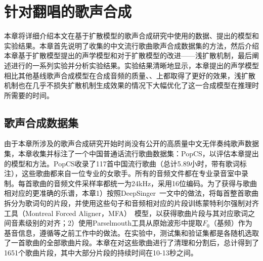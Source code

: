 \newcommand{\etal}{\textit{et al}.}
\newcommand{\ie}{\textit{i}.\textit{e}.}
\newcommand{\eg}{\textit{e}.\textit{g}.}
\newcommand{\vardbtilde}[1]{\tilde{\raisebox{0pt}[0.85\height]{$\tilde{#1}$}}}
\newcommand{\defeq}{\coloneqq}
\newcommand{\grad}{\nabla}
\newcommand{\E}{\mathbb{E}}
\newcommand{\Var}{\mathrm{Var}}
\newcommand{\Cov}{\mathrm{Cov}}
\newcommand{\Ea}[1]{\E\left[#1\right]}
\newcommand{\Eb}[2]{\E_{#1}\!\left[#2\right]}
\newcommand{\Vara}[1]{\Var\left[#1\right]}
\newcommand{\Varb}[2]{\Var_{#1}\left[#2\right]}
\newcommand{\kl}[2]{D_{\mathrm{KL}}\!\left(#1 ~ \| ~ #2\right)}
\newcommand{\pdata}{{p_\mathrm{data}}}
\newcommand{\bA}{\mathbf{A}}
\newcommand{\bI}{\mathbf{I}}
\newcommand{\bJ}{\mathbf{J}}
\newcommand{\bH}{\mathbf{H}}
\newcommand{\bL}{\mathbf{L}}
\newcommand{\bM}{\mathbf{M}}
\newcommand{\bQ}{\mathbf{Q}}
\newcommand{\bR}{\mathbf{R}}
\newcommand{\bzero}{\mathbf{0}}
\newcommand{\bone}{\mathbf{1}}
\newcommand{\bb}{\mathbf{b}}
\newcommand{\bu}{\mathbf{u}}
\newcommand{\bv}{\mathbf{v}}
\newcommand{\bw}{\mathbf{w}}
\newcommand{\bx}{\mathbf{x}}
\newcommand{\by}{\mathbf{y}}
\newcommand{\bz}{\mathbf{z}}
\newcommand{\bxh}{\hat{\mathbf{x}}}
\newcommand{\btheta}{{\boldsymbol{\theta}}}
\newcommand{\bphi}{{\boldsymbol{\phi}}}
\newcommand{\bepsilon}{{\boldsymbol{\epsilon}}}
\newcommand{\bmu}{{\boldsymbol{\mu}}}
\newcommand{\bnu}{{\boldsymbol{\nu}}}
\chapter{针对翻唱的歌声合成}
本章将详细介绍本文在基于扩散模型的歌声合成研究中使用的数据、提出的模型和实验结果。本章首先说明了收集的中文流行歌曲歌声合成数据集的方法，然后介绍本章基于扩散模型提出的声学模型和对于扩散模型的改进——浅扩散机制，最后阐述进行的一系列实验并分析实验结果。实验结果清晰地显示，本章提出的声学模型相比其他基线歌声合成模型在合成音频的质量、、上都取得了更好的效果，浅扩散机制也在几乎不损失扩散机制生成效果的情况下大幅优化了这一合成模型在推理时所需要的时间。
\section{歌声合成数据集}
由于本章所涉及的歌声合成研究开始时尚没有公开的高质量中文无伴奏纯歌声数据集，本章收集并标注了一个中国普通话流行歌曲数据集：PopCS，以评估本章提出的模型和方法。PopCS收录了117首中国流行歌曲（总计5.89小时，带有歌词标注），这些歌曲都来自一位专业的女歌手。所有的音频文件都在专业录音室中录制。每首歌曲的音频文件采样率都统一为24kHz，采用16位编码。为了获得与歌曲相对应的更准确的乐谱，本章1）按照DeepSinger~\citep{ren2020deepsinger}一文中的做法，将每首整首歌曲拆分为歌词句的片段，并使用这些句子和音频相对应的片段训练蒙特利尔强制对齐工具（Montreal Forced Aligner，MFA）~\citep{mcauliffe2017montreal}模型，以获得歌曲片段与其对应歌词之间音素级别的对齐；2）使用Parselmouth工具从原始波形中提取$F_0$（基频）作为基音信息，遵循\citet{wu2020adversarially,blaauw2020sequence,ren2020deepsinger}等之前工作中的做法。在实验中，测试集和验证集都是各随机选取了一首歌曲的全部歌曲片段。本章在对这些歌曲进行了清理和分割后，总计得到了1651个歌曲片段，其中大部分片段的持续时间在10-13秒之间。
